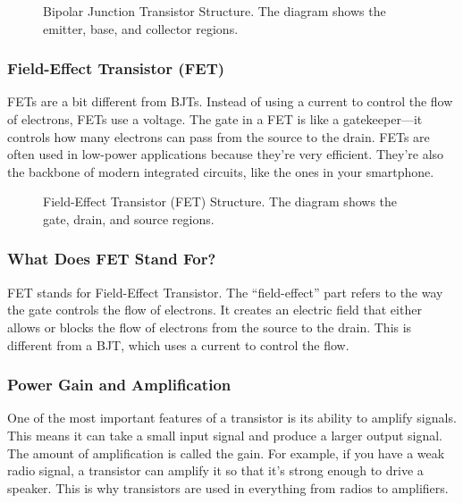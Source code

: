 \begin{figure}[h!]
    \centering
    \caption{Bipolar Junction Transistor Structure. The diagram shows the emitter, base, and collector regions.}
    \label{fig:bjt_structure}
\end{figure}

\subsubsection*{Field-Effect Transistor (FET)}
FETs are a bit different from BJTs. Instead of using a current to control the flow of electrons, FETs use a voltage. The gate in a FET is like a gatekeeper—it controls how many electrons can pass from the source to the drain. FETs are often used in low-power applications because they’re very efficient. They’re also the backbone of modern integrated circuits, like the ones in your smartphone.

\begin{figure}[h!]
    \centering
    \caption{Field-Effect Transistor (FET) Structure. The diagram shows the gate, drain, and source regions.}
    \label{fig:fet_structure}
\end{figure}

\subsubsection*{What Does FET Stand For?}
FET stands for Field-Effect Transistor. The “field-effect” part refers to the way the gate controls the flow of electrons. It creates an electric field that either allows or blocks the flow of electrons from the source to the drain. This is different from a BJT, which uses a current to control the flow.

\subsubsection*{Power Gain and Amplification}
One of the most important features of a transistor is its ability to amplify signals. This means it can take a small input signal and produce a larger output signal. The amount of amplification is called the gain. For example, if you have a weak radio signal, a transistor can amplify it so that it’s strong enough to drive a speaker. This is why transistors are used in everything from radios to amplifiers.

